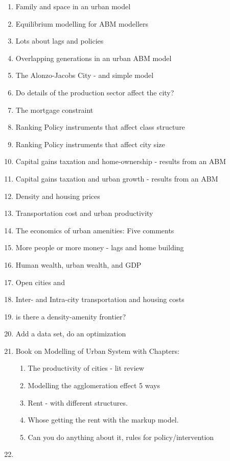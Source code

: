 \documentclass[]{article}
\begin{document}
\begin{enumerate}
    \item Family and space in an urban model
    \item Equilibrium modelling for ABM modellers 
    \item Lots about lags and policies
    \item Overlapping generations in an urban ABM model 
    \item The Alonzo-Jacobs City - and simple model
    \item Do details of the production sector affect the city?
    \item The mortgage constraint
    \item Ranking Policy instruments that affect class structure
    \item Ranking Policy instruments that affect city size 
    \item Capital gains taxation and home-ownership - results from an ABM
    \item Capital gains taxation and urban growth - results from an ABM
    \item Density and housing prices
    \item Transportation cost and urban productivity
    \item The economics of urban amenities: Five comments
    \item More people or more money - lags and home building 
    \item Human wealth, urban wealth, and GDP
    \item Open cities and 
    \item Inter- and Intra-city transportation and housing costs
    \item is there a density-amenity frontier?
    \item Add a data set, do an optimization
    \item Book on  Modelling of Urban System with Chapters:
    \begin{enumerate}
        \item The productivity of cities - lit review 
        \item  Modelling the agglomeration effect 5 ways
        \item  Rent - with different structures.
        \item  Whose getting the rent with the markup model.
        \item  Can  you do anything about it, rules for policy/intervention
    \end{enumerate}  

    \item 
    \end{enumerate}  
\end{document}
